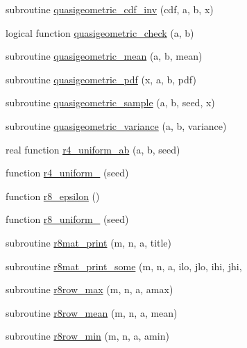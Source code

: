 \begin{DoxyCompactItemize}
\item 
subroutine \hyperlink{_bhabha__fortran__sem__doxy_8f_a810c63c1882371219cad270ca4181c25}{quasigeometric\+\_\+cdf\+\_\+inv} (cdf, a, b, x)
\item 
logical function \hyperlink{_bhabha__fortran__sem__doxy_8f_a96bb9b2b221ea79c95939f9dbe18e9ea}{quasigeometric\+\_\+check} (a, b)
\item 
subroutine \hyperlink{_bhabha__fortran__sem__doxy_8f_a418662fcf5cf28009331bdcfec409cdf}{quasigeometric\+\_\+mean} (a, b, mean)
\item 
subroutine \hyperlink{_bhabha__fortran__sem__doxy_8f_a57411de0fdc63ca7e4e22123a96481fa}{quasigeometric\+\_\+pdf} (x, a, b, pdf)
\item 
subroutine \hyperlink{_bhabha__fortran__sem__doxy_8f_a1256bc0c59e7792531846e68107508c0}{quasigeometric\+\_\+sample} (a, b, seed, x)
\item 
subroutine \hyperlink{_bhabha__fortran__sem__doxy_8f_a8a8ee18a7af38d1039a568f9addd8f82}{quasigeometric\+\_\+variance} (a, b, variance)
\item 
real function \hyperlink{_bhabha__fortran__sem__doxy_8f_ae3ff5bb6289eaf322c0388b7b4bef196}{r4\+\_\+uniform\+\_\+ab} (a, b, seed)
\item 
function \hyperlink{_bhabha__fortran__sem__doxy_8f_ad22a9ea3f2620ff201ba0eeec82e0ae6}{r4\+\_\+uniform\+\_} (seed)
\item 
function \hyperlink{_bhabha__fortran__sem__doxy_8f_ac9af998845bffd8c6eed4d4cf52d9c08}{r8\+\_\+epsilon} ()
\item 
function \hyperlink{_bhabha__fortran__sem__doxy_8f_adda13d639fe87cc3f3c9875a30c8276c}{r8\+\_\+uniform\+\_} (seed)
\item 
subroutine \hyperlink{_bhabha__fortran__sem__doxy_8f_acd023da27fb88ef28004cf11f5942d05}{r8mat\+\_\+print} (m, n, a, title)
\item 
subroutine \hyperlink{_bhabha__fortran__sem__doxy_8f_a432586d1ce42c3c748dc0659c9626c86}{r8mat\+\_\+print\+\_\+some} (m, n, a, ilo, jlo, ihi, jhi,
\item 
subroutine \hyperlink{_bhabha__fortran__sem__doxy_8f_a704f15e9fc2805ec7c3daf97bb353f1c}{r8row\+\_\+max} (m, n, a, amax)
\item 
subroutine \hyperlink{_bhabha__fortran__sem__doxy_8f_a0d5ecf067cee9f1578dbce581a7eccf4}{r8row\+\_\+mean} (m, n, a, mean)
\item 
subroutine \hyperlink{_bhabha__fortran__sem__doxy_8f_a7c1325ae8ea9f6aa9109e208712afcd1}{r8row\+\_\+min} (m, n, a, amin)
\item 

\end{DoxyCompactItemize}
